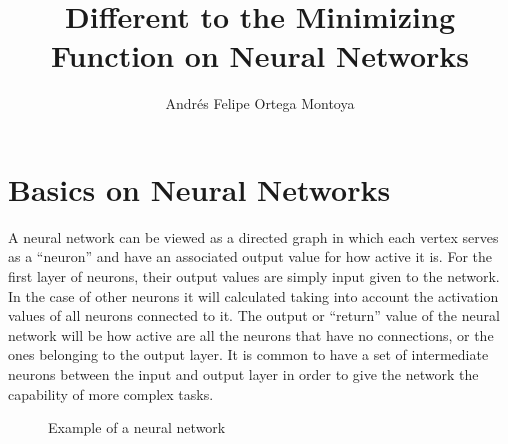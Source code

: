 \documentclass[a4paper, 12pts]{amsart}
\title{Different to the Minimizing Function on Neural Networks}
\author{Andrés Felipe Ortega Montoya\\
  \monthyeardate{\today}}
\begin{document}
\maketitle
\tableofcontents
\section{Basics on Neural Networks}
A neural network can be viewed as a directed graph in which each vertex serves
as a ``neuron'' and have an associated output value for how active it is.
For the first layer of neurons, their output values are simply input given to
the network. In the case of other neurons it will calculated taking into
account the activation values of all neurons connected to it. The output or
``return'' value of the neural network will be how active are all the neurons
that have no connections, or the ones belonging to the output layer. It is
common to have a set of intermediate neurons between the input and output layer
in order to give the network the capability of more complex tasks.

\begin{figure}[!h]
  \centering
  \def\layersep{2.5cm}

  \caption{Example of a neural network}
\end{figure}
\end{document}
